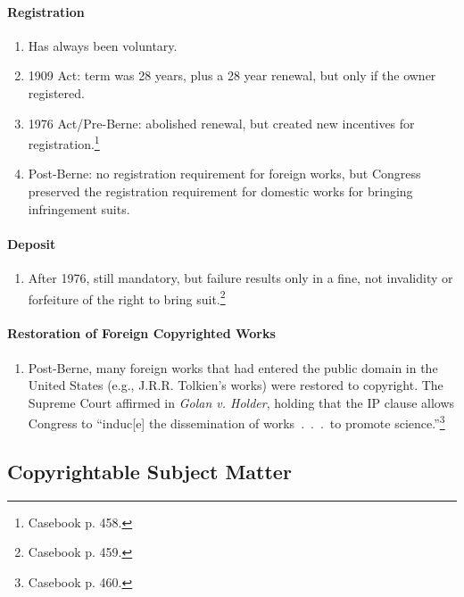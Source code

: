 \paragraph{Registration}

\begin{enumerate}
    \item Has always been voluntary.
    \item 1909 Act: term was 28 years, plus a 28 year renewal, but only if the 
    owner registered.
    \item 1976 Act/Pre-Berne: abolished renewal, but created new incentives 
    for registration.\footnote{Casebook p. 458.}
    \item Post-Berne: no registration requirement for foreign works, but 
    Congress preserved the registration requirement for domestic works for 
    bringing infringement suits.
\end{enumerate}

\paragraph{Deposit}

\begin{enumerate}
    \item After 1976, still mandatory, but failure results only in a fine, not 
    invalidity or forfeiture of the right to bring suit.\footnote{Casebook p. 
    459.}
\end{enumerate}

\paragraph{Restoration of Foreign Copyrighted Works}

\begin{enumerate}
    \item Post-Berne, many foreign works that had entered the public domain in 
    the United States (e.g., J.R.R. Tolkien's works) were restored to 
    copyright. The Supreme Court affirmed in \emph{Golan v. Holder}, holding 
    that the IP clause allows Congress to ``induc[e] the dissemination of 
    works~.~.~.~to promote science.''\footnote{Casebook p. 460.}
\end{enumerate}

\subsection{Copyrightable Subject Matter}

